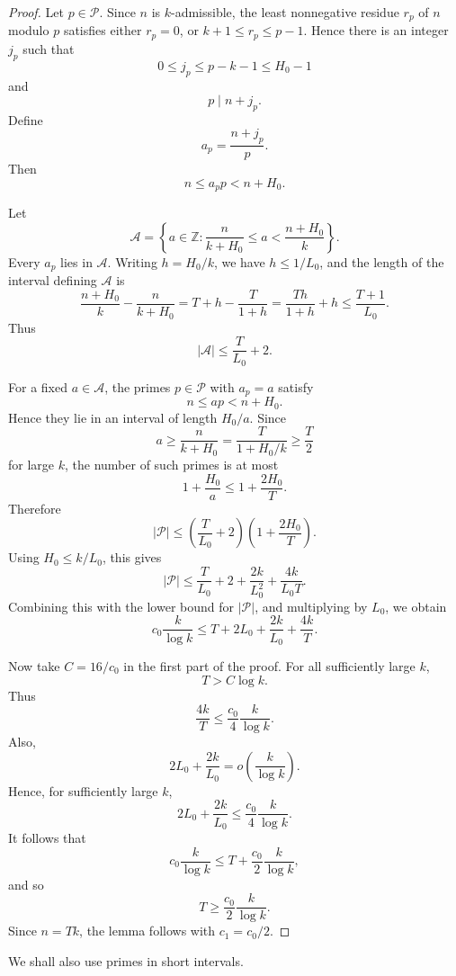 \documentclass[11pt]{article}
\newcommand{\ZZ}{\mathbb Z}
\begin{document}
\begin{proof}
Let \(p\in\mathcal P\). Since \(n\) is \(k\)-admissible, the least
nonnegative residue \(r_p\) of \(n\) modulo \(p\) satisfies either \(r_p=0\), or
\(k+1\le r_p\le p-1\). Hence there is an integer \(j_p\) such that
\[
        0\le j_p\le p-k-1\le H_0-1
\]
and
\[
        p\mid n+j_p .
\]
Define
\[
        a_p=\frac{n+j_p}{p} .
\]
Then
\[
        n\le a_pp<n+H_0 .
\]

Let
\[
        \mathcal A=
        \left\{
        a\in\ZZ:
        \frac{n}{k+H_0}\le a<\frac{n+H_0}{k}
        \right\} .
\]
Every \(a_p\) lies in \(\mathcal A\). Writing \(h=H_0/k\), we have
\(h\le1/L_0\), and the length of the interval defining \(\mathcal A\) is
\[
        \frac{n+H_0}{k}-\frac{n}{k+H_0}
        =
        T+h-\frac{T}{1+h}
        =
        \frac{Th}{1+h}+h
        \le
        \frac{T+1}{L_0}.
\]
Thus
\[
        |\mathcal A|\le \frac{T}{L_0}+2 .
\]

For a fixed \(a\in\mathcal A\), the primes \(p\in\mathcal P\) with \(a_p=a\)
satisfy
\[
        n\le ap<n+H_0 .
\]
Hence they lie in an interval of length \(H_0/a\). Since
\[
        a\ge \frac{n}{k+H_0}
        =
        \frac{T}{1+H_0/k}
        \ge
        \frac{T}{2}
\]
for large \(k\), the number of such primes is at most
\[
        1+\frac{H_0}{a}
        \le
        1+\frac{2H_0}{T}.
\]
Therefore
\[
        |\mathcal P|
        \le
        \left(\frac{T}{L_0}+2\right)
        \left(1+\frac{2H_0}{T}\right).
\]
Using \(H_0\le k/L_0\), this gives
\[
        |\mathcal P|
        \le
        \frac{T}{L_0}+2+\frac{2k}{L_0^2}+\frac{4k}{L_0T}.
\]
Combining this with the lower bound for \(|\mathcal P|\), and multiplying by
\(L_0\), we obtain
\[
        c_0\frac{k}{\log k}
        \le
        T+2L_0+\frac{2k}{L_0}+\frac{4k}{T}.
\]

Now take \(C=16/c_0\) in the first part of the proof. For all sufficiently
large \(k\),
\[
        T>C\log k .
\]
Thus
\[
        \frac{4k}{T}
        \le
        \frac{c_0}{4}\frac{k}{\log k}.
\]
Also,
\[
        2L_0+\frac{2k}{L_0}
        =
        o\!\left(\frac{k}{\log k}\right).
\]
Hence, for sufficiently large \(k\),
\[
        2L_0+\frac{2k}{L_0}
        \le
        \frac{c_0}{4}\frac{k}{\log k}.
\]
It follows that
\[
        c_0\frac{k}{\log k}
        \le
        T+\frac{c_0}{2}\frac{k}{\log k},
\]
and so
\[
        T\ge \frac{c_0}{2}\frac{k}{\log k}.
\]
Since \(n=Tk\), the lemma follows with \(c_1=c_0/2\).
\end{proof}

We shall also use primes in short intervals.
\end{document}
